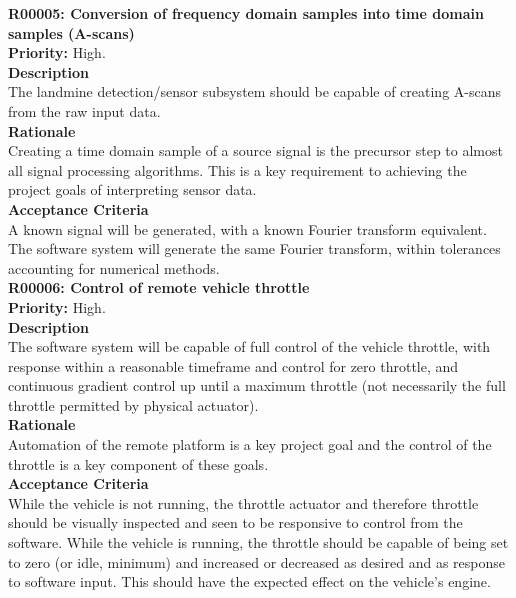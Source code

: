 \documentclass[main.tex]{subfiles}
\begin{document}
\begin{appendices}
\textbf{R00005: Conversion of frequency domain samples into time domain samples (A-scans)}\\
\textbf{Priority:} High.\\
\textbf{Description}\\
The landmine detection/sensor subsystem should be capable of creating A-scans from the raw input data.\\
\textbf{Rationale}\\
Creating a time domain sample of a source signal is the precursor step to almost all signal processing algorithms. This is a key requirement to achieving the project goals of interpreting sensor data.\\
\textbf{Acceptance Criteria}\\
A known signal will be generated, with a known Fourier transform equivalent. The software system will generate the same Fourier transform, within tolerances accounting for numerical methods.\\


\textbf{R00006: Control of remote vehicle throttle}\\
\textbf{Priority:} High.\\
\textbf{Description}\\
The software system will be capable of full control of the vehicle throttle, with response within a reasonable timeframe and control for zero throttle, and continuous gradient control up until a maximum throttle (not necessarily the full throttle permitted by physical actuator).\\
\textbf{Rationale}\\
Automation of the remote platform is a key project goal and the control of the throttle is a key component of these goals.\\
\textbf{Acceptance Criteria}\\
While the vehicle is not running, the throttle actuator and therefore throttle should be visually inspected and seen to be responsive to control from the software. While the vehicle is running, the throttle should be capable of being set to zero (or idle, minimum) and increased or decreased as desired and as response to software input. This should have the expected effect on the vehicle’s engine.\\


\end{appendices}
\end{document}
